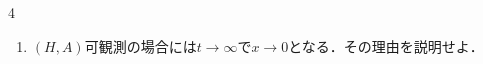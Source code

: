 \begin{multicols}{4}
\begin{enumerate}
\begin{enumerate}
\item
$(H,A)$可観測の場合には$t \rightarrow \infty$で$x \rightarrow 0$となる．その理由を説明せよ．
\end{enumerate}





\end{enumerate}
\end{multicols}



